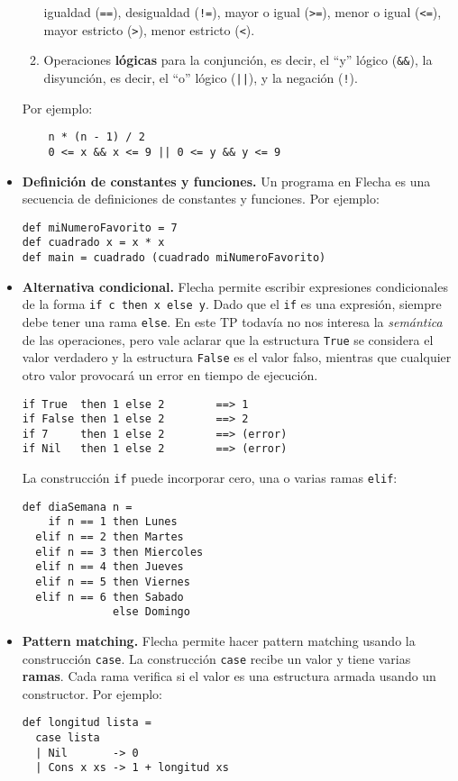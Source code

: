 \documentclass{article}
\newcommand{\flecha}{\textsf{Flecha}\xspace}
\newcommand{\fl}[1]{\texttt{#1}}
\begin{document}
\begin{itemize}
\begin{enumerate}
        igualdad (\fl{==}), desigualdad (\fl{!=}),
        mayor o igual (\fl{>=}), menor o igual (\fl{<=}),
        mayor estricto (\fl{>}), menor estricto (\fl{<}).
  \item Operaciones {\bf lógicas} para
        la conjunción, es decir, el ``y'' lógico (\fl{&&}),
        la disyunción, es decir, el ``o'' lógico (\fl{||}),
        y la negación (\fl{!}).
  \end{enumerate}
  Por ejemplo:
  \begin{verbatim}
    n * (n - 1) / 2
    0 <= x && x <= 9 || 0 <= y && y <= 9
  \end{verbatim}
\item {\bf Definición de constantes y funciones.}
  Un programa en \flecha es una secuencia de definiciones de constantes
  y funciones. Por ejemplo:
\begin{verbatim}
def miNumeroFavorito = 7
def cuadrado x = x * x
def main = cuadrado (cuadrado miNumeroFavorito)
\end{verbatim}
\item {\bf Alternativa condicional.}
  \flecha permite escribir expresiones condicionales
  de la forma \fl{if c then x else y}.
  Dado que el \fl{if} es una expresión, siempre debe tener una
  rama \fl{else}.
  En este TP todavía no nos interesa la {\em semántica} de las
  operaciones, pero vale aclarar que la estructura \fl{True}
  se considera el valor verdadero y la estructura \fl{False} es el
  valor falso, mientras que cualquier otro valor provocará un error
  en tiempo de ejecución.
\begin{verbatim}
if True  then 1 else 2        ==> 1
if False then 1 else 2        ==> 2
if 7     then 1 else 2        ==> (error)
if Nil   then 1 else 2        ==> (error)
\end{verbatim}
  La construcción \fl{if} puede incorporar cero, una o varias ramas
  \fl{elif}:
\begin{verbatim}
def diaSemana n =
    if n == 1 then Lunes
  elif n == 2 then Martes
  elif n == 3 then Miercoles
  elif n == 4 then Jueves
  elif n == 5 then Viernes
  elif n == 6 then Sabado
              else Domingo
\end{verbatim}
\item {\bf Pattern matching.}
\flecha permite hacer pattern matching usando la construcción \fl{case}.
La construcción \fl{case} recibe un valor y tiene varias {\bf ramas}.
Cada rama verifica si el valor es una estructura armada usando un
constructor. Por ejemplo:
\begin{verbatim}
def longitud lista =
  case lista
  | Nil       -> 0
  | Cons x xs -> 1 + longitud xs


\end{verbatim}
\end{itemize}
\end{document}

